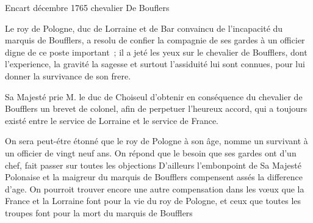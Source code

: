                      \begin{diary}{Encart}{}
                              décembre 1765
                              chevalier De Bouflers
                           \bigskip
        
        
                              Le roy de Pologne, duc de
                              Lorraine et de
                              Bar convaincu de l'incapacité du marquis
                                 de Boufflers, a resolu de confier la compagnie
                                 de ses gardes à un officier digne de ce poste
                              important ; il a jeté les yeux sur le chevalier de
                                 Boufflers, dont l'experience, la gravité
                              la sagesse et surtout l'assiduité lui sont
                              connues, pour lui donner la survivance de
                              son frere. \bigskip
        
        
                              Sa Majesté prie M. le duc de Choiseul
                              d'obtenir en conséquence du
                                 chevalier de
                                 Boufflers un brevet de colonel, afin de
                              perpetuer l'heureux accord, qui a toujours
                              existé entre le service de Lorraine et le
                              service de France. \bigskip
        
         On sera peut-étre étonné que le
                                 roy de
                                 Pologne à son âge, nomme un survivant
                              à un officier de vingt neuf ans. On répond
                              que le besoin que ses gardes ont d'un
                              chef, fait passer sur toutes les objections D'ailleurs
                              l'embonpoint de Sa Majesté
                                 Polonaise et la maigreur du marquis de
                                 Boufflers compensent assés la difference
                              d'age. On pourroit trouver encore une
                              autre compensation dans les vœux que la
                                 France et la
                                 Lorraine font pour la vie
                              du roy de Pologne, et
                              ceux que toutes
                              les troupes font pour la mort du
                                 marquis
                                 de Boufflers
                           \bigskip
        

\end{diary}
